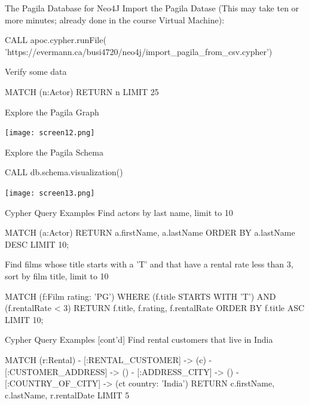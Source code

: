 \documentclass[ignorenonframetext,xcolor=x11names]{beamer}
\begin{document}
\begin{frame}[fragile]{The Pagila Database for Neo4J}
Import the Pagila Datase (This may take ten or more minutes; already done in the course Virtual Machine):
\scriptsize
\begin{cyphercode}
CALL apoc.cypher.runFile(
'https://evermann.ca/busi4720/neo4j/import_pagila_from_csv.cypher')
\end{cyphercode}
\normalsize
Verify some data
\small
\begin{cyphercode}
MATCH (n:Actor) RETURN n LIMIT 25
\end{cyphercode}
\end{frame}

\begin{frame}{Explore the Pagila Graph}
\centering

\texttt{[image: screen12.png]}
\end{frame}

\begin{frame}[fragile]{Explore the Pagila Schema}
\small
\begin{cyphercode}
CALL db.schema.visualization()
\end{cyphercode}
\centering

\texttt{[image: screen13.png]}
\end{frame}

\begin{frame}[fragile]{Cypher Query Examples}
Find actors by last name, limit to 10
\footnotesize
\begin{cyphercode}
MATCH (a:Actor) 
RETURN a.firstName, a.lastName
ORDER BY a.lastName DESC
LIMIT 10;
\end{cyphercode}
\normalsize
Find films whose title starts with a 'T' and that have a rental rate less than 3, sort by film title, limit to 10
\footnotesize
\begin{cyphercode}
MATCH (f:Film {rating: 'PG'})
WHERE (f.title STARTS WITH 'T') AND (f.rentalRate < 3)
RETURN f.title, f.rating, f.rentalRate
ORDER BY f.title ASC LIMIT 10;
\end{cyphercode}
\end{frame}

\begin{frame}[fragile]{Cypher Query Examples \small [cont'd]}
Find rental customers that live in India
\footnotesize
\begin{cyphercode}
MATCH (r:Rental) 
        - [:RENTAL_CUSTOMER] -> (c) 
        - [:CUSTOMER_ADDRESS] -> () 
        - [:ADDRESS_CITY] -> ()
        - [:COUNTRY_OF_CITY] -> (ct {country: 'India'})
RETURN c.firstName, c.lastName, r.rentalDate LIMIT 5
\end{cyphercode}
\end{frame}
\end{document}
